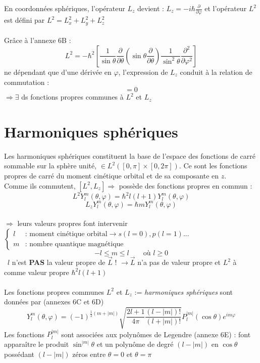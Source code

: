 \documentclass	[11pt, a4paper, openany]{book}
\newcommand{\danger}{{\huge\fontencoding{U}\fontfamily{futs}\selectfont\char 66\relax}\ }
\begin{document}
	En coordonnées sphériques, l'opérateur $L_z$ devient : $L_z=-i\hbar\frac{\partial}{\partial\varphi}$ et l'opérateur $L^2$ est défini par $L^2=L^2_x+L_y^2+L_z^2$\\\\
	Grâce à l'annexe 6B : \begin{equation}
	L^2=-\hbar^2\left[\frac{1}{\sin\theta}\frac{\partial}{\partial\theta}\left(\sin\theta\frac{\partial}{\partial\theta}\right)\frac{1}{\sin^2\theta}\frac{\partial^2}{\partial\varphi^2}\right]
	\end{equation}
	ne dépendant que d'une dérivée en $\varphi$, l'expression de $L_z$ conduit à la relation de commutation :\begin{equation}
	[L^2,L_z]=0
	\end{equation}
	$\Rightarrow\exists$ ds fonctions propres communes à $L^2$ et $L_z$
	\section{Harmoniques sphériques}
	Les harmoniques sphériques constituent la base de l'espace des fonctions de carré sommable sur la sphère unité, $\in L^2([0,\pi]\times[0,2\pi])$. Ce sont les fonctions propres de carré du moment cinétique orbital et de sa composante en $z$.\\
	Comme ils commutent, $[L^2,L_z]\Rightarrow$ possède des fonctions propres en commun : \begin{equation}
	L^2Y_l^m(\theta,\varphi)=\hbar^2l(l+1)Y_l^m(\theta,\varphi)
	\end{equation}\begin{equation}
	L_zY^m_l(\theta,\varphi)=\hbar mY_l^m(\theta,\varphi)
	\end{equation}\ \\
	$\Rightarrow$ leurs valeurs propres font intervenir $\left\{\begin{array}{cl}
	l & \text{: moment cinétique orbital} \rightarrow s(l=0),p(l=1)...\\
	m & \text{: nombre quantique magnétique}
	\end{array}\right.$
	\begin{equation}
		-l\leq m\leq l\qquad \text{où }l\geq 0
	\end{equation}
	\danger $l$ n'est \textbf{PAS} la valeur propre de $\vec L$ ! $\rightarrow \vec L$ n'a pas de valeur propre et $L^2$ à comme valeur propre $\hbar^2l(l+1)$ \\\\
	Les fonctions propres communes $L^2$ et $L_z$ := \textit{harmoniques sphériques} sont données par (annexes 6C et 6D)\begin{equation}
	Y_l^m(\theta,\varphi)=(-1)^{\frac{1}{2}(m+|m|)}\sqrt{\frac{2l+1}{4\pi}\frac{(l-|m|)!}{(l+|m|)!}}P_l^{|m|}(\cos\theta)e^{im\varphi}
	\end{equation}
	Les fonctions $P_l^{|m|}$ sont associées aux polynômes de Legendre (annexe 6E) : font apparaître le produit $\sin^{|m|}\theta$ et un polynôme de degré $(l-|m|)$ en $\cos\theta$ possédant $(l-|m|)$ zéros entre $\theta=0$ et $\theta=\pi$
\end{document}
